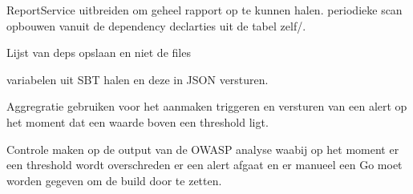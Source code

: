 ReportService uitbreiden om geheel rapport op te kunnen halen.
periodieke scan opbouwen vanuit de dependency declarties uit de tabel zelf/.

Lijst van deps opslaan en niet de files

variabelen uit SBT halen en deze in JSON versturen.

Aggregratie gebruiken voor het aanmaken triggeren en versturen van een alert op het moment dat een waarde boven een threshold ligt.

Controle maken op de output van de OWASP analyse waabij op het moment er een threshold wordt overschreden er een alert afgaat en er manueel een Go moet worden gegeven om de build door te zetten.

